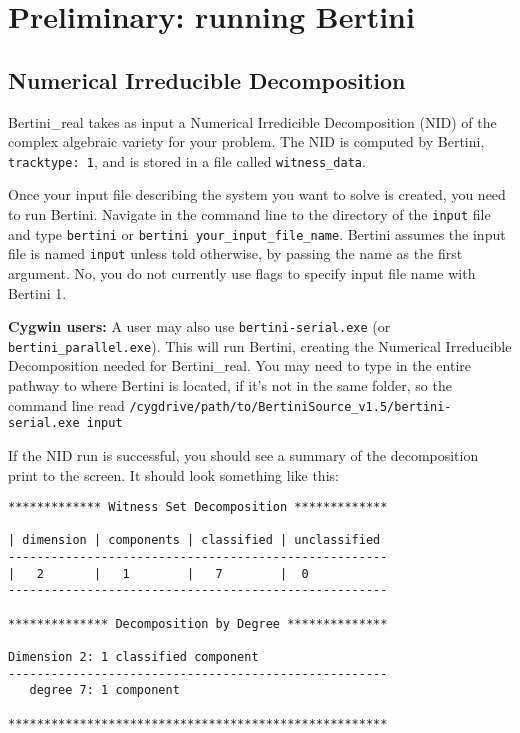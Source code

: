 \section{Preliminary: running Bertini}

\subsection{Numerical Irreducible Decomposition}

Bertini\_real takes as input a Numerical Irredicible Decomposition (NID) of the complex algebraic variety for your problem.  The NID is computed by Bertini, {\tt tracktype: 1}, and is stored in a file called {\tt witness\_data}.


Once your input file describing the system you want to solve is created, you need to run Bertini.  Navigate in the command line to the directory of the {\tt input} file and type \texttt{bertini} or \texttt{bertini your\_input\_file\_name}.  Bertini assumes the input file is named {\tt input} unless told otherwise, by passing the name as the first argument.  No, you do not currently use flags to specify input file name with Bertini 1.

\textbf{Cygwin users:} A user may also use \texttt{bertini-serial.exe} (or \texttt{bertini\_parallel.exe}). This will run Bertini, creating the Numerical Irreducible Decomposition needed for Bertini\_real.  You may need to type in the entire pathway to where Bertini is located, if it's not in the same folder, so the command line read \newline \texttt{/cygdrive/path/to/BertiniSource\_v1.5/bertini-serial.exe input}


If the NID run is successful, you should see a summary of the decomposition print to the screen.  It should look something like this:

\begin{lstlisting}[caption={Example NID screen output, tracktype 1 in Bertini 1}, captionpos=b]
************* Witness Set Decomposition *************

| dimension | components | classified | unclassified
-----------------------------------------------------
|   2       |   1        |   7        |  0
-----------------------------------------------------

************** Decomposition by Degree **************

Dimension 2: 1 classified component
-----------------------------------------------------
   degree 7: 1 component

*****************************************************
\end{lstlisting}


